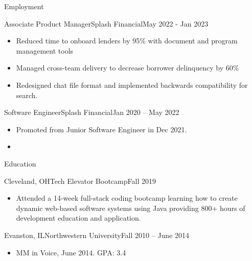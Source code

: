 \documentclass[]{mcdowellcv}
\begin{document}
	\makeheader
	
	\begin{cvsection}{Employment}
		\begin{cvsubsection}{Associate Product Manager}{Splash Financial}{May 2022 - Jan 2023}			
			\begin{itemize}
				\item Reduced time to onboard lenders by 95\% with document and program management tools
				\item Managed cross-team delivery to decrease borrower delinquency by 60\%
				\item Redesigned chat file format and implemented backwards compatibility for search.
			\end{itemize}
		\end{cvsubsection}
		
		\begin{cvsubsection}{Software Engineer}{Splash Financial}{Jan 2020 -- May 2022}	
			\begin{itemize}
				\item Promoted from Junior Software Engineer in Dec 2021.
				\item 
			\end{itemize}
		\end{cvsubsection}
	\end{cvsection}
	
	\begin{cvsection}{Education}
		\begin{cvsubsection}{Cleveland, OH}{Tech Elevator Bootcamp}{Fall 2019}
			\begin{itemize}
				\item  Attended a 14-week full-stack coding bootcamp learning how to create dynamic web-based software systems using Java providing 800+ hours of development education and application.
			\end{itemize}
		\end{cvsubsection}
		\begin{cvsubsection}{Evanston, IL}{Northwestern University}{Fall 2010 -- June 2014}
			\begin{itemize}
				\item MM in Voice, June 2014. GPA: 3.4
			\end{itemize}
		\end{cvsubsection}
	\end{cvsection}
	
\end{document}
